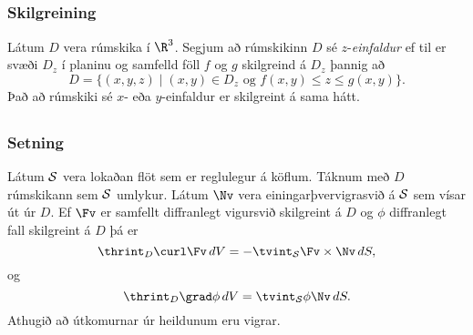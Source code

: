 \subsection{} 

\subsubsection{Skilgreining \rtask{}}
 Látum $D$ vera rúmskika í $\R^3$.  Segjum að rúmskikinn $D$ sé $z$-{\em einfaldur} ef til er svæði $D_z$ í planinu og samfelld föll $f$ og $g$ skilgreind á $D_z$ þannig að 
$$D=\{(x,y,z)\mid (x,y)\in D_z\mbox{ og }f(x,y)\leq z\leq g(x,y)\}.$$
Það að rúmskiki sé $x$- eða $y$-einfaldur er skilgreint á sama hátt. 






\subsection{} 

\subsubsection{Setning \rtask{}}
Látum $\cal S$ vera lokaðan flöt sem er reglulegur á köflum.  Táknum með $D$ rúmskikann sem $\cal S$ umlykur.  Látum $\Nv$ vera einingarþvervigrasvið á $\cal S$   sem vísar út úr $D$.  Ef $\Fv$ er samfellt diffranlegt vigursvið skilgreint á $D$ og $\phi$ diffranlegt fall skilgreint á $D$ þá er
$$\thrint_D\curl \Fv\,dV=-\tvint_{\cal S}\Fv\times\Nv\,dS,$$
og 
$$\thrint_D\grad\phi\,dV=\tvint_{\cal S}\phi\Nv\,dS.$$
Athugið að útkomurnar úr heildunum eru vigrar.





